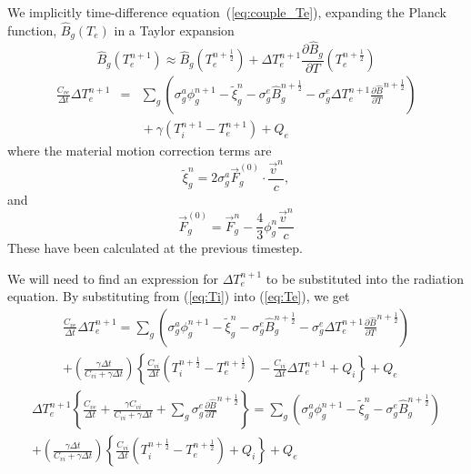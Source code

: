 \documentclass{article}
\newcommand{\partl}[2]{\ensuremath{\frac{\partial{#1}}{\partial{#2}}}}\newcommand{\del}{\ensuremath{\vec{\nabla}}}
\newcommand{\dt}{\ensuremath{\Delta t}}
\newcommand{\cviOdt}{\ensuremath{\frac{C_{vi}}{\dt}}}
\newcommand{\cveOdt}{\ensuremath{\frac{C_{ve}}{\dt}}}
\newcommand{\Bg}{\ensuremath{\hat{B}_{g}}}
\newcommand{\Bgnphlf}{\ensuremath{\hat{B}_{g}^{n+\frac{1}{2}}}}
\newcommand{\pBgnphlfdT}{\ensuremath{\frac{\partial\hat{B}}{\partial T}^{n+\frac{1}{2}}}}
\begin{document}
We implicitly time-difference equation~(\ref{eq:couple_Te}),
expanding the Planck function,
$\Bg(T_{e})$ in a Taylor expansion
\begin{equation}
        \Bg(T_{e}^{n+1}) \approx \Bg(T_{e}^{n+\frac{1}{2}})
                 + \Delta T_{e}^{n+1} \partl{\Bg}{T}(T_{e}^{n+\frac{1}{2}})
\end{equation}
\begin{eqnarray}
        \cveOdt \Delta T_{e}^{n+1} &=&
                \sum_{g} \left(
                        \sigma_{g}^{a} \phi_{g}^{n+1} - \tilde{\xi}_{g}^{n}
                        - \sigma_{g}^{e} \Bgnphlf
                        - \sigma_{g}^{e} \Delta T_{e}^{n+1} \pBgnphlfdT 
                        \right) \nonumber \\
                & & \mbox{} + \gamma (T_{i}^{n+1} - T_{e}^{n+1}) + Q_{e}
\label{eq:Te}
\end{eqnarray}
where the material motion correction terms are
\begin{equation}
        \tilde{\xi}_{g}^{n} = 2 \sigma_{g}^{a} \vec{F}_{g}^{(0)} \cdot
                                \frac{\vec{v}^{n}}{c}, 
\label{eq:tilde_xi}
\end{equation}
and
\begin{equation}
        \vec{F}_{g}^{(0)} = \vec{F}_{g}^{n} - \frac{4}{3} \phi_{g}^{n}
                                                \frac{\vec{v}^{n}}{c}
\end{equation}
These have been calculated at the previous timestep.

We will need to find an expression for $\Delta T_{e}^{n+1}$ to be
substituted into the radiation equation.
By substituting from (\ref{eq:Ti}) into (\ref{eq:Te}), we get
\begin{multline}
        \cveOdt \Delta T_{e}^{n+1} =
                \sum_{g} \left(
                        \sigma_{g}^{a} \phi_{g}^{n+1} - \tilde{\xi}_{g}^{n}
                        - \sigma_{g}^{e} \Bgnphlf
                        - \sigma_{g}^{e} \Delta T_{e}^{n+1} \pBgnphlfdT 
                        \right)
        \\
                         + \left(\frac{\gamma\dt}{C_{vi} + 
                                        \gamma \dt} \right)
                        \left\{\cviOdt(T_{i}^{n+\frac{1}{2}}-T_{e}^{n+\frac{1}{2}})
                                 - \cviOdt \Delta T_{e}^{n+1}
                        + Q_{i} \right\}
                        + Q_{e}
\end{multline}
\begin{multline}
        \Delta T_{e}^{n+1} \left\{ \cveOdt +
                \frac{\gamma C_{vi}}{C_{vi} + \gamma \dt } +
                \sum_{g} \sigma_{g}^{e} \pBgnphlfdT \right\} =
                   \sum_{g} \left( \sigma_{g}^{a} \phi_{g}^{n+1} - 
                        \tilde{\xi}_{g}^{n} - \sigma_{g}^{e} \Bgnphlf \right)
        \\
                  +  \left(\frac{\gamma\dt}{C_{vi} + 
                                        \gamma \dt} \right)
                        \left\{\cviOdt(T_{i}^{n+\frac{1}{2}}-T_{e}^{n+\frac{1}{2}}) + Q_{i} \right\}
                         + Q_{e}
\end{multline}
\end{document}
